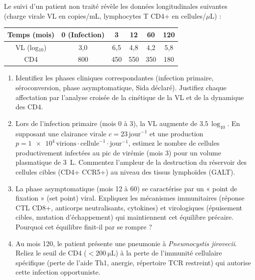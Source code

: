 \documentclass[11pt]{article}
\begin{document}
\begin{exercice}
Le suivi d'un patient non traité révèle les données longitudinales suivantes (charge virale VL en copies/mL, lymphocytes T CD4+ en cellules/$\mu$L) :

\begin{center}
\begin{tabular}{cccccc}
\toprule
Temps (mois) & 0 (Infection) & 3 & 12 & 60 & 120 \\
\midrule
VL (log$_{10}$) & 3,0 & 6,5 & 4,8 & 4,2 & 5,8 \\
CD4 & 800 & 450 & 550 & 350 & 180 \\
\bottomrule
\end{tabular}
\end{center}

\begin{enumerate}
    \item Identifiez les phases cliniques correspondantes (infection primaire, séroconversion, phase asymptomatique, Sida déclaré). Justifiez chaque affectation par l'analyse croisée de la cinétique de la VL et de la dynamique des CD4.
    \item Lors de l'infection primaire (mois 0 à 3), la VL augmente de $\num{3,5}\,\log_{10}$. En supposant une clairance virale $c = \num{23}\,\text{jour}^{-1}$ et une production $p = \num{1e4}\,\text{virions}\cdot\text{cellule}^{-1}\cdot\text{jour}^{-1}$, estimez le nombre de cellules productivement infectées au pic de virémie (mois 3) pour un volume plasmatique de \SI{3}{\liter}. Commentez l'ampleur de la destruction du réservoir des cellules cibles (CD4+ CCR5+) au niveau des tissus lymphoïdes (GALT).
    \item La phase asymptomatique (mois 12 à 60) se caractérise par un « point de fixation » (set point) viral. Expliquez les mécanismes immunitaires (réponse CTL CD8+, anticorps neutralisants, cytokines) et virologiques (épuisement cibles, mutation d'échappement) qui maintiennent cet équilibre précaire. Pourquoi cet équilibre finit-il par se rompre ?
    \item Au mois 120, le patient présente une pneumonie à \textit{Pneumocystis jirovecii}. Reliez le seuil de CD4 ($<\SI{200}{\micro\liter}$) à la perte de l'immunité cellulaire spécifique (perte de l'aide Th1, anergie, répertoire TCR restreint) qui autorise cette infection opportuniste.
\end{enumerate}
\end{exercice}
\end{document}

